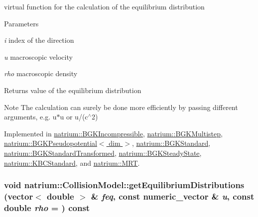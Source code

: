 virtual function for the calculation of the equilibrium distribution 
\begin{DoxyParams}{Parameters}
\item[{\em i}]index of the direction \item[{\em u}]macroscopic velocity \item[{\em rho}]macroscopic density \end{DoxyParams}
\begin{DoxyReturn}{Returns}
value of the equilibrium distribution 
\end{DoxyReturn}
\begin{DoxyNote}{Note}
The calculation can surely be done more efficiently by passing different arguments, e.g. u$\ast$u or u/(c$^\wedge$2) 
\end{DoxyNote}


Implemented in \hyperlink{classnatrium_1_1BGKIncompressible_a26dd8954261b04f8383ca9d37f5ac8c0}{natrium::BGKIncompressible}, \hyperlink{classnatrium_1_1BGKMultistep_a034cd475974bcce0db64e52245efd91d}{natrium::BGKMultistep}, \hyperlink{classnatrium_1_1BGKPseudopotential_a366ccd417ca4ad5fa37ce0572e0d6fe4}{natrium::BGKPseudopotential$<$ dim $>$}, \hyperlink{classnatrium_1_1BGKStandard_a3d45ef2fe5536bf14914f99297477754}{natrium::BGKStandard}, \hyperlink{classnatrium_1_1BGKStandardTransformed_a870465cc026f92c8ffba899af6f95634}{natrium::BGKStandardTransformed}, \hyperlink{classnatrium_1_1BGKSteadyState_ad99d9159cc14b5897bea7f145c3b39ca}{natrium::BGKSteadyState}, \hyperlink{classnatrium_1_1KBCStandard_a1dac2deaafb93027bf168887dd2e002d}{natrium::KBCStandard}, and \hyperlink{classnatrium_1_1MRT_a3f96915f9f67680f4a1d7b952e70be55}{natrium::MRT}.\hypertarget{classnatrium_1_1CollisionModel_a296474961c4501bc23228be1d30ebf82}{
\subsubsection[{getEquilibriumDistributions}]{\setlength{\rightskip}{0pt plus 5cm}void natrium::CollisionModel::getEquilibriumDistributions (vector$<$ double $>$ \& {\em feq}, \/  const {\bf numeric\_\-vector} \& {\em u}, \/  const double {\em rho} = {}) const}}
\label{classnatrium_1_1CollisionModel_a296474961c4501bc23228be1d30ebf82}


